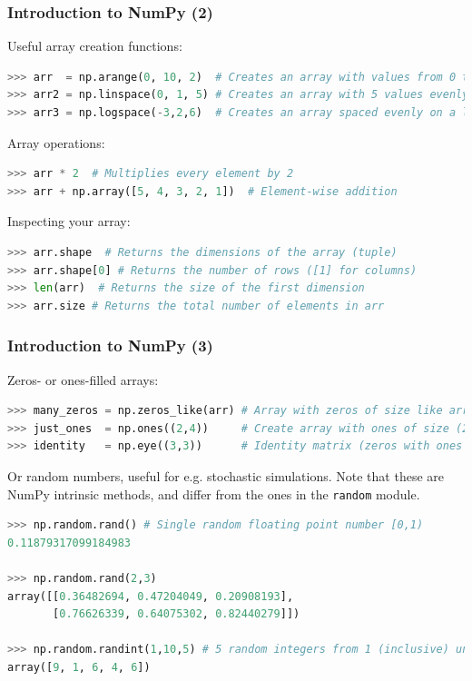 \begin{frame}[fragile]
  \frametitle{Introduction to NumPy (2)}
  Useful array creation functions:
  \begin{lstlisting}[language=Python, numbers=none]
>>> arr  = np.arange(0, 10, 2)  # Creates an array with values from 0 to 10, step 2
>>> arr2 = np.linspace(0, 1, 5) # Creates an array with 5 values evenly spaced between 0 and 1
>>> arr3 = np.logspace(-3,2,6)  # Creates an array spaced evenly on a logscale
  \end{lstlisting}\pause

  Array operations:
  \begin{lstlisting}[language=Python, numbers=none]
>>> arr * 2  # Multiplies every element by 2
>>> arr + np.array([5, 4, 3, 2, 1])  # Element-wise addition
  \end{lstlisting}\pause
  
  Inspecting your array:
  \begin{lstlisting}[language=Python, numbers=none]
>>> arr.shape  # Returns the dimensions of the array (tuple)
>>> arr.shape[0] # Returns the number of rows ([1] for columns)
>>> len(arr)  # Returns the size of the first dimension
>>> arr.size # Returns the total number of elements in arr
  \end{lstlisting}
\end{frame}

\begin{frame}[fragile]
  \frametitle{Introduction to NumPy (3)}
  Zeros- or ones-filled arrays:
  \begin{lstlisting}[language=Python, numbers=none]
>>> many_zeros = np.zeros_like(arr) # Array with zeros of size like arr, also: np.zeros
>>> just_ones  = np.ones((2,4))     # Create array with ones of size (2,4), also: np.ones_like
>>> identity   = np.eye((3,3))      # Identity matrix (zeros with ones on the main diagonal)
    \end{lstlisting}\pause
      
    Or random numbers, useful for e.g. stochastic simulations. Note that these are NumPy intrinsic methods, and differ from the ones in the \lstinline|random| module.
    \begin{lstlisting}[language=Python, numbers=none]
>>> np.random.rand() # Single random floating point number [0,1)
0.11879317099184983

>>> np.random.rand(2,3)
array([[0.36482694, 0.47204049, 0.20908193],
       [0.76626339, 0.64075302, 0.82440279]])

>>> np.random.randint(1,10,5) # 5 random integers from 1 (inclusive) until 10 (exclusive)
array([9, 1, 6, 4, 6])
        \end{lstlisting}
\end{frame}

